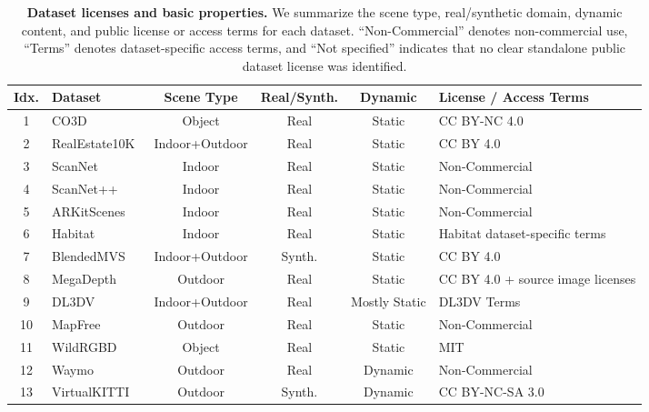 
\begin{table}[h]
\caption{\textbf{Dataset licenses and basic properties.}
We summarize the scene type, real/synthetic domain, dynamic content, and public license or access terms for each dataset.
``Non-Commercial'' denotes non-commercial use, ``Terms'' denotes dataset-specific access terms, and ``Not specified'' indicates that no clear standalone public dataset license was identified.}
\label{tab:dataset_profile_summary_cited}
\centering
\tiny
\setlength{\tabcolsep}{3.2pt}
\renewcommand{\arraystretch}{1.1}
\begin{tabularx}{\textwidth}{@{}c >{\centering\arraybackslash}X c c c >{\centering\arraybackslash}X@{}}
\toprule
\textbf{Idx.} & \textbf{Dataset} & \textbf{Scene Type} & \textbf{Real/Synth.} & \textbf{Dynamic} & \textbf{License / Access Terms} \\
\midrule
1  & CO3D~\cite{reizenstein2021co3d} & Object & Real & Static & CC BY-NC 4.0 \\
2  & RealEstate10K~\cite{zhou2018stereomagnification} & Indoor+Outdoor & Real & Static & CC BY 4.0 \\
3  & ScanNet~\cite{dai2017scannet} & Indoor & Real & Static & Non-Commercial \\
4  & ScanNet++~\cite{yeshwanth2023scannet++} & Indoor & Real & Static & Non-Commercial \\
5  & ARKitScenes~\cite{dehghan2021arkitscenes} & Indoor & Real & Static & Non-Commercial \\
6  & Habitat~\cite{savva2019habitat} & Indoor & Real & Static & Habitat dataset-specific terms \\
7  & BlendedMVS~\cite{yao2020blendedmvs} & Indoor+Outdoor & Synth. & Static & CC BY 4.0 \\
8  & MegaDepth~\cite{li2018megadepth} & Outdoor & Real & Static & CC BY 4.0 + source image licenses \\
9  & DL3DV~\cite{ling2024dl3dv} & Indoor+Outdoor & Real & Mostly Static & DL3DV Terms \\
10 & MapFree~\cite{arnold2022mapfree} & Outdoor & Real & Static & Non-Commercial \\
11 & WildRGBD~\cite{xia2024wildrgbd} & Object & Real & Static & MIT \\
12 & Waymo~\cite{sun2020waymo} & Outdoor & Real & Dynamic & Non-Commercial \\
13 & VirtualKITTI~\cite{cabon2020vkitti} & Outdoor & Synth. & Dynamic & CC BY-NC-SA 3.0 \\

\end{tabularx}
\end{table}
